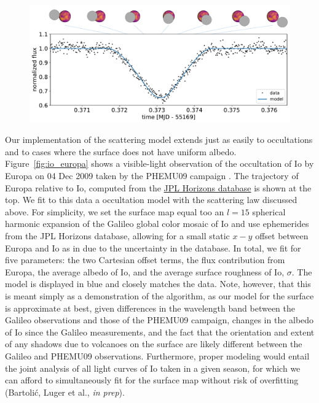 \documentclass[modern]{aastex62}
\begin{document}
\begin{figure}[t!]
    \begin{centering}
        \includegraphics[width=\linewidth]{figures/io_europa.pdf}
    \end{centering}
\end{figure}

Our implementation of the scattering model extends just as easily
to occultations and to cases where the surface does not have uniform albedo.
Figure~\ref{fig:io_europa} shows a visible-light observation of the
occultation of Io by Europa on 04 Dec 2009 taken by the PHEMU09
campaign \citep{Arlot2014}. The trajectory of Europa relative to Io,
computed from the \href{https://ssd.jpl.nasa.gov/horizons.cgi}{JPL Horizons database}
is shown at the top. We fit to this data a \starry occultation model
with the scattering law discussed above.
For simplicity, we set the surface map equal too
an $l=15$ spherical harmonic expansion of the Galileo global color mosaic
of Io \citep{Becker2005} and use ephemerides from the JPL Horizons
database, allowing for a small static $x-y$ offset between Europa and Io as
in \citep{Arlot2014} due to the uncertainty in the database. In total,
we fit for five parameters: the two Cartesian offset terms,
the flux contribution from Europa, the average
albedo of Io, and the average surface roughness of Io, $\sigma$. The model
is displayed in blue and closely matches the data.
%
Note, however, that this is meant simply as a demonstration of the \starry
algorithm, as our model for the surface is approximate at best, given
differences in the wavelength band between the Galileo observations and
those of the PHEMU09 campaign, changes in the albedo of Io since the Galileo
measurements, and the fact that the orientation and extent of any shadows
due to volcanoes on the surface are likely different between the Galileo
and PHEMU09 observations. Furthermore,
proper modeling would entail the
joint analysis of all light curves of Io taken in a given season, for which
we can afford to simultaneously fit for the surface map without risk of
overfitting (Bartoli\'c, Luger et al., \emph{in prep}).
\end{document}
